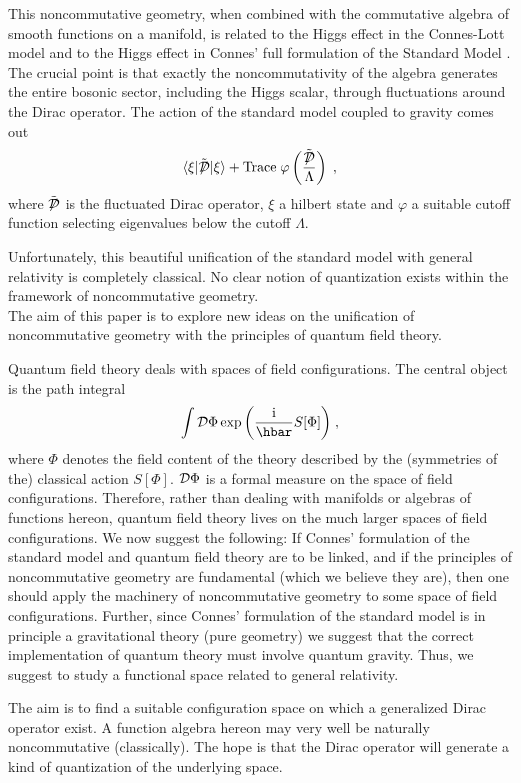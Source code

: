 \documentclass[12pt]{article}
\def\F{\Phi}
\def\cd{{\cal D}}
\begin{document}
This noncommutative geometry, when combined with the commutative algebra of smooth functions on a
manifold, is related to the Higgs effect in the Connes-Lott model
\cite{Connes:1990qp} and to the Higgs effect in
Connes' full formulation of the Standard Model \cite{Connes:1996gi}. The crucial point is
that exactly the noncommutativity of the algebra generates the entire bosonic
sector, including the Higgs scalar,
through fluctuations around the Dirac operator. The action of the standard model coupled
to gravity comes out \cite{Chamseddine:1991qh,Chamseddine:1996rw}
\[
\langle\xi |
\tilde{\displaystyle{\not}\cd} |\xi \rangle + \mbox{Trace} \;\varphi\left( \frac{\tilde{\displaystyle{\not}\cd}}{\Lambda}\right)\;,
\]
where $\tilde{\displaystyle{\not}\cd}$ is the fluctuated Dirac operator, $\xi$
a hilbert state and $\varphi$ a suitable cutoff function selecting eigenvalues
below the cutoff $\Lambda$. 

Unfortunately, this beautiful unification of the standard model with general relativity is
completely classical. No clear notion of quantization exists within the
framework of noncommutative geometry.\\


The aim of this paper is to explore new ideas on the unification of noncommutative geometry with
the principles of quantum field theory. 

Quantum field theory deals with spaces of field configurations. The central object is the path integral 
\[
\int \cd\F\exp{\left(\frac{\rm{i}}{\hbar}S[\F]\right)}\;,
\]
where $\F$ denotes the field content of the theory described by the
(symmetries of the) classical action
$S[\F]$. $\cd\F$ is a formal measure on the space of field
configurations. Therefore, rather than dealing with manifolds or 
algebras of functions hereon, quantum field theory lives on the much larger spaces of field
configurations. 
We now suggest the following: If Connes' formulation of the standard model and quantum field theory are to be linked, and if the
principles of noncommutative geometry are fundamental (which we believe they are), then one should apply the machinery of noncommutative geometry
to some space of field configurations. Further, since Connes' formulation of
the standard model is in principle a gravitational theory (pure geometry) we suggest that
the correct implementation of quantum theory must involve quantum
gravity. Thus, we suggest to study a functional space related to
general relativity. 

The aim is to find a suitable configuration space on which a generalized
Dirac operator exist. A function algebra hereon may very well be naturally
noncommutative (classically). The hope is that the Dirac operator will
generate a kind of quantization of the underlying space.
   
\end{document}
